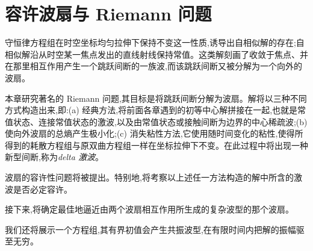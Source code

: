 \documentclass[../main.tex]{subfiles}
\begin{document}
\chapter{容许波扇与 Riemann 问题}\label{chapter:ch09-容许波扇与riemann问题}

守恒律方程组在时空坐标均匀拉伸下保持不变这一性质,诱导出自相似解的存在;自相似解沿从时空某一焦点发出的直线射线保持常值。这类解刻画了收敛于焦点、并在那里相互作用产生一个跳跃间断的一族波,而该跳跃间断又被分解为一个向外的波扇。

本章研究著名的 Riemann 问题,其目标是将跳跃间断分解为波扇。解将以三种不同方式构造出来,即:(a) 经典方法,将前面各章遇到的初等中心解拼接在一起,也就是常值状态、连接常值状态的激波,以及由常值状态或接触间断为边界的中心稀疏波;(b) 使向外波扇的总熵产生极小化;(c) 消失粘性方法,它使用随时间变化的粘性,使得所得到的耗散方程组与原双曲方程组一样在坐标拉伸下不变。在此过程中将出现一种新型间断,称为\emph{delta 激波}。

波扇的容许性问题将被提出。特别地,将考察以上述任一方法构造的解中所含的激波是否必定容许。

接下来,将确定最佳地逼近由两个波扇相互作用所生成的复杂波型的那个波扇。

我们还将展示一个方程组,其有界初值会产生共振波型,在有限时间内把解的振幅驱至无穷。






















\end{document}
